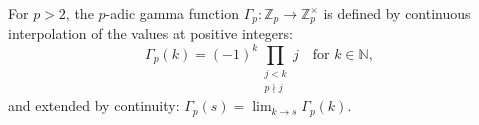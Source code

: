 For $p > 2$, the $p$-adic gamma function $\Gamma_p: \mathbb{Z}_p \to \mathbb{Z}_p^\times$ is defined by continuous interpolation of the values at positive integers: $$\Gamma_p(k) = (-1)^k \prod_{\substack{j < k \\ p \nmid j}} j \quad \text{for } k \in \mathbb{N},$$ and extended by continuity: $\Gamma_p(s) = \lim_{k \to s} \Gamma_p(k)$.
